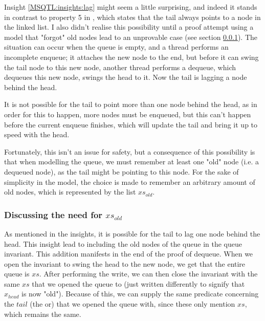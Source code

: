 \documentclass[twoside,11pt,openright]{report}
\begin{document}
Insight \ref{MSQTL:insights:lag} might seem a little surprising, and indeed it stands in contrast to property 5 in \cite{DBLP:conf/podc/MichaelS96}, which states that the tail always points to a node in the linked list. I also didn't realise this possibility until a proof attempt using a model that "forgot" old nodes lead to an unprovable case (see section \ref{MSQTL:Discussion:xs_old}). The situation can occur when the queue is empty, and a thread performs an incomplete enqueue; it attaches the new node to the end, but before it can swing the tail node to this new node, another thread performs a dequeue, which dequeues this new node, swings the head to it. Now the tail is lagging a node behind the head.

It is not possible for the tail to point more than one node behind the head, as in order for this to happen, more nodes must be enqueued, but this can't happen before the current enqueue finishes, which will update the tail and bring it up to speed with the head.

Fortunately, this isn't an issue for safety, but a consequence of this possibility is that when modelling the queue, we must remember at least one "old" node (i.e. a dequeued node), as the tail might be pointing to this node. For the sake of simplicity in the model, the choice is made to remember an arbitrary amount of old nodes, which is represented by the list $xs_{old}$.


\subsubsection{Discussing the need for $xs_{old}$}\label{MSQTL:Discussion:xs_old}

As mentioned in the insights, it is possible for the tail to lag one node behind the head. This insight lead to including the old nodes of the queue in the queue invariant. This addition manifests in the end of the proof of dequeue. When we open the invariant to swing the head to the new node, we get that the entire queue is $xs$. After performing the write, we can then close the invariant with the same $xs$ that we opened the queue to (just written differently to signify that $x_{head}$ is now "old"). Because of this, we can supply the same predicate concerning the $tail$ (the or) that we opened the queue with, since these only mention $xs$, which remains the same.
\end{document}
